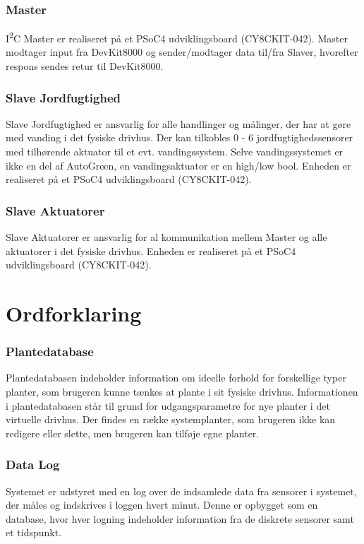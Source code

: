 \subsubsection{\IIC Master}
I\textsuperscript{2}C Master er realiseret på et PSoC4 udviklingsboard (CY8CKIT-042). 
\IIC Master modtager input fra DevKit8000 og sender/modtager data til/fra \IIC Slaver, hvorefter respons sendes retur til DevKit8000.
\subsubsection{\IIC Slave Jordfugtighed}
\IIC Slave Jordfugtighed er ansvarlig for alle handlinger og målinger, der har at gøre med vanding i det fysiske drivhus. Der kan tilkobles 0 - 6 jordfugtighedssensorer med tilhørende aktuator til et evt. vandingssystem. Selve vandingssystemet er ikke en del af AutoGreen, en vandingsaktuator er en high/low bool. Enheden er realiseret på et PSoC4 udviklingsboard (CY8CKIT-042).
\subsubsection{\IIC Slave Aktuatorer}
\IIC Slave Aktuatorer er ansvarlig for al kommunikation mellem \IIC Master og alle aktuatorer i det fysiske drivhus. Enheden er realiseret på et PSoC4 udviklingsboard (CY8CKIT-042).

\section{Ordforklaring}

\subsubsection{Plantedatabase}
Plantedatabasen indeholder information om ideelle forhold for forskellige typer planter, som brugeren kunne tænkes at plante i sit fysiske drivhus. 
Informationen i plantedatabasen står til grund for udgangsparametre for nye planter i det virtuelle drivhus. Der findes en række systemplanter, som brugeren ikke kan redigere eller slette, men brugeren kan tilføje egne planter.
\subsubsection{Data Log}
Systemet er udstyret med en log over de indsamlede data fra sensorer i systemet, der måles og indskrives i loggen hvert minut. 
Denne er opbygget som en database, hvor hver logning indeholder information fra de diskrete sensorer samt et tidspunkt. 
